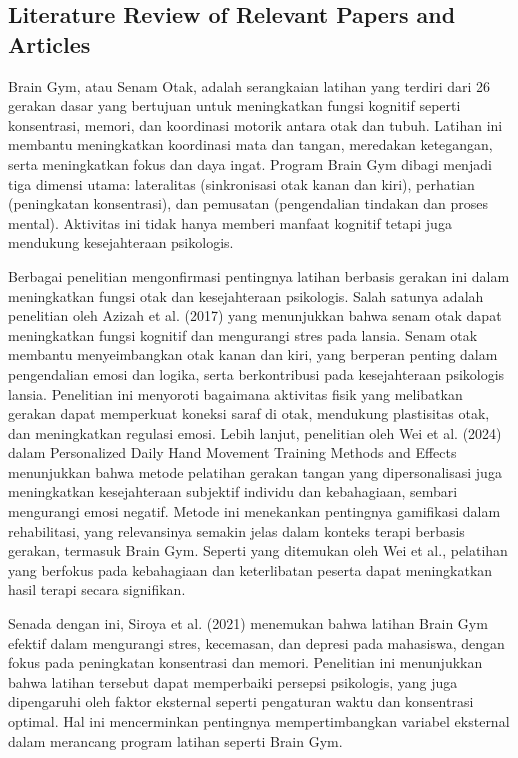 \documentclass[12pt,a4paper]{article}
\begin{document}
\subsection{Literature Review of Relevant Papers and Articles}
Brain Gym, atau Senam Otak, adalah serangkaian latihan yang terdiri dari 26 gerakan dasar yang bertujuan untuk meningkatkan fungsi kognitif seperti konsentrasi, memori, dan koordinasi motorik antara otak dan tubuh. Latihan ini membantu meningkatkan koordinasi mata dan tangan, meredakan ketegangan, serta meningkatkan fokus dan daya ingat. Program Brain Gym dibagi menjadi tiga dimensi utama: lateralitas (sinkronisasi otak kanan dan kiri), perhatian (peningkatan konsentrasi), dan pemusatan (pengendalian tindakan dan proses mental). Aktivitas ini tidak hanya memberi manfaat kognitif tetapi juga mendukung kesejahteraan psikologis.

Berbagai penelitian mengonfirmasi pentingnya latihan berbasis gerakan ini dalam meningkatkan fungsi otak dan kesejahteraan psikologis. Salah satunya adalah penelitian oleh Azizah et al. (2017) yang menunjukkan bahwa senam otak dapat meningkatkan fungsi kognitif dan mengurangi stres pada lansia. Senam otak membantu menyeimbangkan otak kanan dan kiri, yang berperan penting dalam pengendalian emosi dan logika, serta berkontribusi pada kesejahteraan psikologis lansia. Penelitian ini menyoroti bagaimana aktivitas fisik yang melibatkan gerakan dapat memperkuat koneksi saraf di otak, mendukung plastisitas otak, dan meningkatkan regulasi emosi.
Lebih lanjut, penelitian oleh Wei et al. (2024) dalam Personalized Daily Hand Movement Training Methods and Effects menunjukkan bahwa metode pelatihan gerakan tangan yang dipersonalisasi juga meningkatkan kesejahteraan subjektif individu dan kebahagiaan, sembari mengurangi emosi negatif. Metode ini menekankan pentingnya gamifikasi dalam rehabilitasi, yang relevansinya semakin jelas dalam konteks terapi berbasis gerakan, termasuk Brain Gym. Seperti yang ditemukan oleh Wei et al., pelatihan yang berfokus pada kebahagiaan dan keterlibatan peserta dapat meningkatkan hasil terapi secara signifikan.

Senada dengan ini, Siroya et al. (2021) menemukan bahwa latihan Brain Gym efektif dalam mengurangi stres, kecemasan, dan depresi pada mahasiswa, dengan fokus pada peningkatan konsentrasi dan memori. Penelitian ini menunjukkan bahwa latihan tersebut dapat memperbaiki persepsi psikologis, yang juga dipengaruhi oleh faktor eksternal seperti pengaturan waktu dan konsentrasi optimal. Hal ini mencerminkan pentingnya mempertimbangkan variabel eksternal dalam merancang program latihan seperti Brain Gym.
\end{document}

